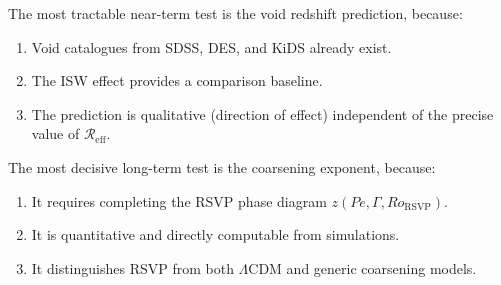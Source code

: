 The most tractable near-term test is the void redshift prediction,
because:
\begin{enumerate}[leftmargin=2em]
  \item Void catalogues from SDSS, DES, and KiDS already exist.
  \item The ISW effect provides a comparison baseline.
  \item The prediction is qualitative (direction of effect)
    independent of the precise value of $\mathcal{R}_{\mathrm{eff}}$.
\end{enumerate}

The most decisive long-term test is the coarsening exponent,
because:
\begin{enumerate}[leftmargin=2em]
  \item It requires completing the RSVP phase diagram
    $z(Pe, \Gamma, Ro_{\mathrm{RSVP}})$.
  \item It is quantitative and directly computable from simulations.
  \item It distinguishes RSVP from both $\Lambda$CDM and generic
    coarsening models.
\end{enumerate}

